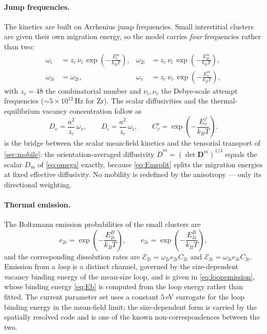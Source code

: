 \documentclass{article}
\begin{document}
\paragraph{Jump frequencies.} The kinetics are built on Arrhenius jump
frequencies. Small interstitial clusters are given their own migration energy,
so the model carries \emph{four} frequencies rather than two:
\begin{align}
\omega_i   &= z_c\,\nu_i\,\exp\!\left(-\frac{E_i^m}{k_BT}\right), &
\omega_{2i}&= z_c\,\nu_i\,\exp\!\left(-\frac{E_{2i}^m}{k_BT}\right), \\
\omega_{3i}&= \omega_{2i}, &
\omega_v   &= z_c\,\nu_v\,\exp\!\left(-\frac{E_v^m}{k_BT}\right),
\label{eq:freqs}
\end{align}
with $z_c=48$ the combinatorial number and $\nu_i,\nu_v$ the Debye-scale attempt
frequencies ($\sim\!5\times10^{12}\,$Hz for Zr). The scalar diffusivities and
the thermal-equilibrium vacancy concentration follow as
\begin{equation}
D_v=\frac{a^2}{z_c}\,\omega_v,\qquad
D_i=\frac{a^2}{z_c}\,\omega_i,\qquad
C_v^e=\exp\!\left(-\frac{E_v^f}{k_BT}\right).
\label{eq:omega}
\end{equation}
 is the bridge between the scalar mean-field kinetics and the
tensorial transport of \cref{sec:mobile}: the orientation-averaged diffusivity
$\overline{D}^m=(\det\bm D^m)^{1/3}$ equals the scalar $D_m$ of \cref{eq:omega}
exactly, because \cref{eq:Emsplit} splits the migration energies at fixed
effective diffusivity. No mobility is redefined by the anisotropy --- only its
directional weighting.

\paragraph{Thermal emission.} The Boltzmann emission probabilities of the small
clusters are
\begin{equation}
e_{2i}= \exp\!\left(-\frac{E_{2i}^B}{k_BT}\right),
\qquad
e_{3i}= \exp\!\left(-\frac{E_{3i}^B}{k_BT}\right),
\label{eq:emit}
\end{equation}
and the corresponding dissolution rates are
$\mathcal{E}_{2i}=\omega_{2i}e_{2i}C_{2i}$ and
$\mathcal{E}_{3i}=\omega_{3i}e_{3i}C_{3i}$. Emission from a \emph{loop} is a
distinct channel, governed by the size-dependent vacancy binding energy of the
mean-size loop, and is given in \cref{eq:loopemission}, whose binding energy
\cref{eq:Eb} is computed from the loop energy rather than fitted. The current
parameter set uses a constant $5\,$eV surrogate for the loop binding energy in
the mean-field limit; the size-dependent form is carried by the spatially
resolved code and is one of the known non-correspondences between the two.
\end{document}
